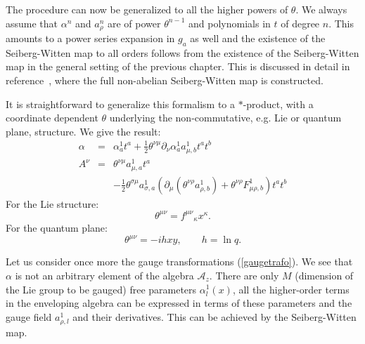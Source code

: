 \documentclass[a4paper,11pt]{article}
\def\nn{\nonumber }
\def\ka{\kappa}
\def\Az{{\mathcal{A}_z}}
\def\pat{\partial}
\begin{document}
The procedure can now be generalized to all the higher 
powers of $\theta$. We always assume that $\alpha^{n}$ and $a_{\rho}^{n}$ are of 
power $\theta^{n-1}$ and polynomials in $t$ of degree $n$. This  
amounts to a power series expansion in $g_a$ as well and the existence 
of the Seiberg-Witten map to all orders follows from the existence
of the Seiberg-Witten map in the general setting of the 
previous chapter. This is discussed in detail in reference~\cite{JSW2},
where the full non-abelian Seiberg-Witten map is constructed.

It is straightforward to generalize this formalism to a $*$-product, with a 
coordinate dependent $\theta$ underlying the non-commutative, e.g. Lie or quantum 
plane, structure. 
We give the result:
\begin{eqnarray}
  \alpha&=&\alpha^1_at^a+\frac{1}{2}\theta^{\nu\mu}\pat_{\nu}\alpha^1_aa^1_{\mu,b}t^at^b\nn\\
  A^{\nu}&=&\theta^{\nu\mu}a^1_{\mu,a}t^a\nn\\
  &&-\frac{1}{2}\theta^{\sigma\mu}a^1_{\sigma,a}\left(\pat_{\mu}(\theta^{\nu\rho}a_{\rho,b}^1)+\theta^{\nu\rho}F^1_{\mu\rho,b}\right)t^at^b
\end{eqnarray}
For the Lie structure:
\begin{equation}
  \theta^{\mu\nu}=f^{\mu\nu}{}_{\ka}x^{\ka}.
\end{equation}
For the quantum plane:
\begin{equation}
  \theta^{\mu\nu}=-ihxy, \qquad h=\ln q.
\end{equation}


Let us consider once more the gauge transformations (\ref{gaugetrafo}). 
We see that $\alpha$ is not an arbitrary element of the algebra $\Az$.
There are only $M$ (dimension of the Lie group to be gauged)
free parameters $\alpha^{1}_l(x)$, all the higher-order terms in the enveloping 
algebra can be expressed in terms of these parameters and the 
gauge field $a^{1}_{\rho,l}$ and their derivatives. This can be achieved by the
Seiberg-Witten map.
\end{document}
